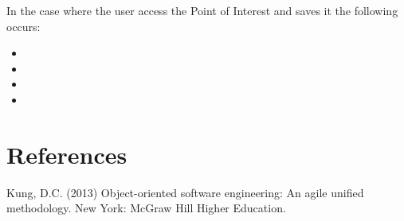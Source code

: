 \documentclass[runningheads,a4paper]{article}
\begin{document}
	In the case where the user access the Point of Interest and saves it the following occurs:
	\begin{itemize}
		\item  
		\item
		\item
		\item
	\end{itemize}
	


\section{References}

Kung, D.C. (2013) Object-oriented software engineering: An agile unified methodology. New York: McGraw Hill Higher Education.
\end{document}
